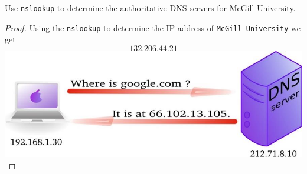 \documentclass[../../main.tex]{subfiles}
\begin{document}
\begin{wts}
Use \lstinline{nslookup} to determine the authoritative DNS servers for McGill University.
\end{wts}
\begin{proof}
Using the \lstinline{nslookup} to determine the IP address of  \lstinline{McGill University} we get\[132.206.44.21\]
\includegraphics[width=\textwidth]{subfiles/images/L5_Manual/L5N2_ DNS & HTTP_PAGE2_2_Image40.jpg}
\end{proof}
\end{document}
